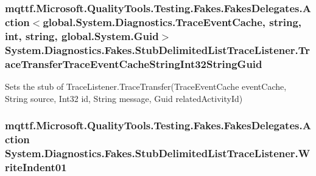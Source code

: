\hypertarget{class_system_1_1_diagnostics_1_1_fakes_1_1_stub_delimited_list_trace_listener_a5ebb88d462c44eac4d56cbcd115ab501}{
\subsubsection[{Trace\-Transfer\-Trace\-Event\-Cache\-String\-Int32\-String\-Guid}]{\setlength{\rightskip}{0pt plus 5cm}mqttf.\-Microsoft.\-Quality\-Tools.\-Testing.\-Fakes.\-Fakes\-Delegates.\-Action$<$global.\-System.\-Diagnostics.\-Trace\-Event\-Cache, string, int, string, global.\-System.\-Guid$>$ System.\-Diagnostics.\-Fakes.\-Stub\-Delimited\-List\-Trace\-Listener.\-Trace\-Transfer\-Trace\-Event\-Cache\-String\-Int32\-String\-Guid}}\label{class_system_1_1_diagnostics_1_1_fakes_1_1_stub_delimited_list_trace_listener_a5ebb88d462c44eac4d56cbcd115ab501}


Sets the stub of Trace\-Listener.\-Trace\-Transfer(\-Trace\-Event\-Cache event\-Cache, String source, Int32 id, String message, Guid related\-Activity\-Id)

\hypertarget{class_system_1_1_diagnostics_1_1_fakes_1_1_stub_delimited_list_trace_listener_afefd817fdb81365f5420a4c58fdd6025}{
\subsubsection[{Write\-Indent01}]{\setlength{\rightskip}{0pt plus 5cm}mqttf.\-Microsoft.\-Quality\-Tools.\-Testing.\-Fakes.\-Fakes\-Delegates.\-Action System.\-Diagnostics.\-Fakes.\-Stub\-Delimited\-List\-Trace\-Listener.\-Write\-Indent01}}\label{class_system_1_1_diagnostics_1_1_fakes_1_1_stub_delimited_list_trace_listener_afefd817fdb81365f5420a4c58fdd6025}



